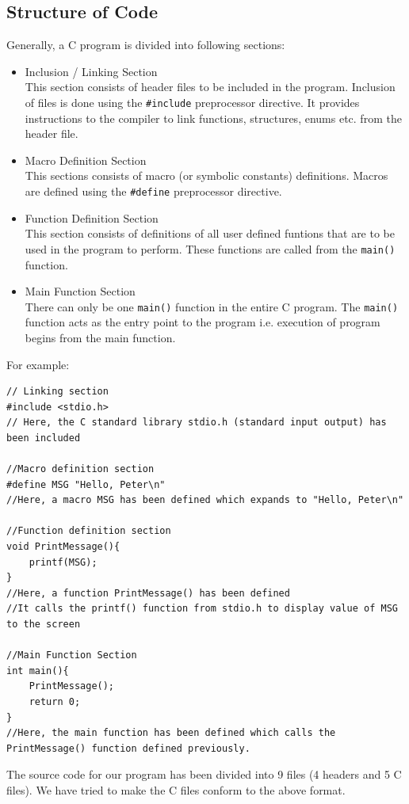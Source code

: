 \documentclass[report.tex]{subfiles}
\begin{document}
    \subsection{Structure of Code}
    Generally, a C program is divided into following sections:
    \begin{itemize}
        \item{Inclusion / Linking Section}\\
            This section consists of header files to be included in the program. Inclusion of files is done using the \texttt{\#include} preprocessor directive. It provides instructions to the compiler to link functions, structures, enums etc. from the header file.
        \item{Macro Definition Section}\\
            This sections consists of macro (or symbolic constants) definitions. Macros are defined using the \texttt{\#define} preprocessor directive. 
        \item{Function Definition Section}\\
            This section consists of definitions of all user defined funtions that are to be used in the program to perform. These functions are called from the \texttt{main()} function.
        \item{Main Function Section}\\
            There can only be one \texttt{main()} function in the entire C program. The \texttt{main()} function acts as the entry point to the program i.e. execution of program begins from the main function.
    \end{itemize}
    For example:    
\begin{lstlisting}
// Linking section
#include <stdio.h>
// Here, the C standard library stdio.h (standard input output) has been included

//Macro definition section
#define MSG "Hello, Peter\n"
//Here, a macro MSG has been defined which expands to "Hello, Peter\n"

//Function definition section
void PrintMessage(){
    printf(MSG);
}
//Here, a function PrintMessage() has been defined
//It calls the printf() function from stdio.h to display value of MSG to the screen

//Main Function Section
int main(){
    PrintMessage();
    return 0;
}
//Here, the main function has been defined which calls the PrintMessage() function defined previously.
\end{lstlisting}
    The source code for our program has been divided into 9 files (4 headers and 5 C files). We have tried to make the C files conform to the above format.
\end{document}

